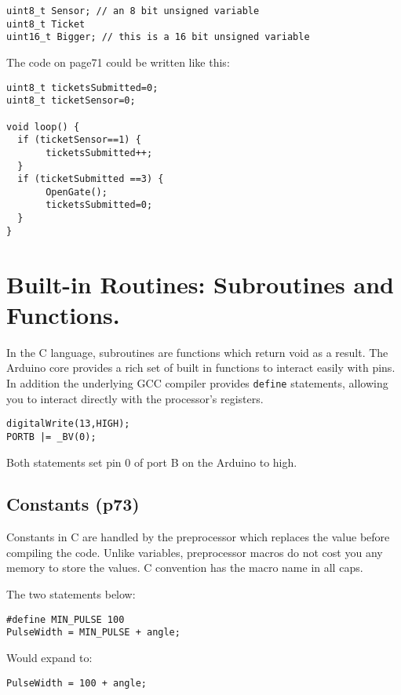 \documentclass{report}
\begin{document}
{{\begin{verbatim}
uint8_t Sensor; // an 8 bit unsigned variable
uint8_t Ticket
uint16_t Bigger; // this is a 16 bit unsigned variable
\end{verbatim}

The code on page71 could be written like this:
\begin{verbatim}
uint8_t ticketsSubmitted=0;
uint8_t ticketSensor=0;

void loop() {
  if (ticketSensor==1) {
       ticketsSubmitted++;
  }
  if (ticketSubmitted ==3) {
       OpenGate();
       ticketsSubmitted=0;
  }
}
\end{verbatim}


\section{Built-in Routines: Subroutines and Functions.}
In the C language, subroutines are functions which return void as a result. The Arduino core provides a rich set of built in functions to interact easily with pins. In addition the underlying GCC compiler provides \verb|define| statements, allowing you to interact directly with the processor's registers.

\begin{verbatim}
digitalWrite(13,HIGH);
PORTB |= _BV(0);
\end{verbatim}

Both statements set pin 0 of port B on the Arduino to high.

\subsection{Constants (p73)}
Constants in C are handled by the preprocessor which replaces the value before compiling the code. Unlike variables, preprocessor macros do not cost you any memory to store the values. C convention has the macro name in all caps.

The two statements below:
\begin{verbatim}
#define MIN_PULSE 100
PulseWidth = MIN_PULSE + angle;
\end{verbatim}
Would expand to:
\begin{verbatim}
PulseWidth = 100 + angle;
\end{verbatim}

}}
\end{document}
